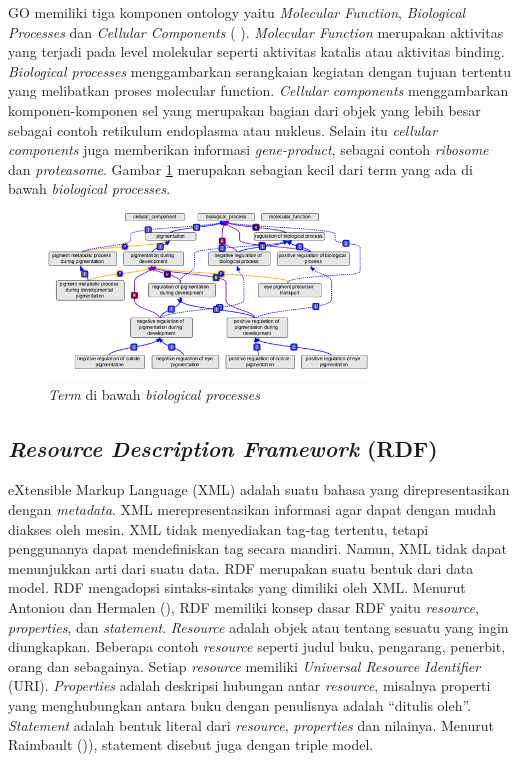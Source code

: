GO memiliki tiga komponen ontology yaitu \textit{Molecular Function}, \textit{Biological Processes} dan \textit{Cellular Components} (\citeauthor{ASHBURNERM2000} \cite*{ASHBURNERM2000}). \textit{Molecular Function} merupakan aktivitas yang terjadi pada level molekular seperti aktivitas katalis atau aktivitas binding.  \textit{Biological processes}  menggambarkan serangkaian kegiatan dengan tujuan tertentu yang melibatkan proses molecular function. \textit{Cellular components} menggambarkan komponen-komponen sel yang merupakan bagian dari objek yang lebih besar sebagai contoh retikulum endoplasma atau nukleus. Selain itu \textit{cellular components} juga memberikan informasi \textit{gene-product}, sebagai contoh \textit{ribosome} dan \textit{proteasome}. Gambar \ref{fig:gene_ontology} merupakan sebagian kecil dari term yang ada di bawah \textit{biological processes}.

\begin{figure}[h!] %
	\centering
	\includegraphics[width=240pt]{geneontology.png}
	\caption{\textit{Term} di bawah \textit{biological processes}}
	\label{fig:gene_ontology}
\end{figure}

\subsection*{\textit{Resource Description Framework} (RDF)}

eXtensible Markup Language (XML) adalah suatu bahasa yang direpresentasikan dengan \textit{metadata}. XML merepresentasikan informasi agar dapat dengan mudah diakses oleh mesin. XML tidak menyediakan tag-tag tertentu, tetapi penggunanya dapat mendefiniskan tag secara mandiri. Namun, XML tidak dapat menunjukkan arti dari suatu data. RDF merupakan suatu bentuk dari data model. RDF mengadopsi sintaks-sintaks yang dimiliki oleh XML. Menurut Antoniou dan Hermalen (\cite*{ANTONIOUG2008}), RDF memiliki konsep dasar RDF yaitu \textit{resource}, \textit{properties}, dan \textit{statement}. \textit{Resource} adalah objek atau tentang sesuatu yang ingin diungkapkan. Beberapa contoh \textit{resource} seperti judul buku, pengarang, penerbit, orang dan sebagainya. Setiap \textit{resource} memiliki \textit{Universal Resource
Identifier} (URI). \textit{Properties} adalah deskripsi hubungan antar \textit{resource}, misalnya properti yang menghubungkan antara buku dengan penulisnya adalah “ditulis oleh”. \textit{Statement} adalah bentuk literal dari \textit{resource}, \textit{properties} dan nilainya. Menurut Raimbault (\cite*{RAIMBAULT2010})), statement disebut juga dengan triple model.

